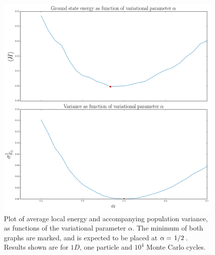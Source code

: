 \documentclass[twocolumn]{article}
\begin{document}
\begin{figure}[ht]
    \centering
    \includegraphics[width=0.9\linewidth]{../results/var-alpha-plot-noimp-10000.png}
    \caption{Plot of average local energy and accompanying population variance,
    as functions of the variational parameter $\alpha$. The minimum of both
    graphs are marked, and is expected to be placed at
    $\alpha=\flatfrac{1}{2}$. Results shown are for $1D$, one particle and
    $10^{4}$ Monte Carlo cycles.}
    \label{fig:var-alpha-plot-noimp}
\end{figure}
\end{document}
